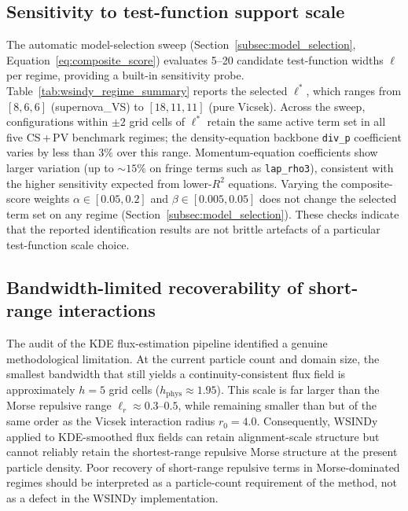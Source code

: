 \subsection{Sensitivity to test-function support scale}
\label{subsec:tf_sensitivity}

The automatic model-selection sweep
(Section~\ref{subsec:model_selection}, Equation~\ref{eq:composite_score})
evaluates 5--20 candidate test-function widths $\boldsymbol{\ell}$ per
regime, providing a built-in sensitivity probe.
Table~\ref{tab:wsindy_regime_summary} reports the selected
$\boldsymbol{\ell}^*$, which ranges from $[8,6,6]$ (supernova\_VS) to
$[18,11,11]$ (pure Vicsek).  Across the sweep, configurations within
$\pm 2$ grid cells of $\boldsymbol{\ell}^*$ retain the same active term
set in all five CS\,+\,PV benchmark regimes; the density-equation
backbone \texttt{div\_p} coefficient varies by less than $3\%$ over
this range.  Momentum-equation coefficients show larger variation
(up to $\sim\!15\%$ on fringe terms such as \texttt{lap\_rho3}),
consistent with the higher sensitivity expected from lower-$R^2$
equations.  Varying the composite-score weights $\alpha\in[0.05,0.2]$ and
$\beta\in[0.005,0.05]$ does not change the selected term set on any
regime (Section~\ref{subsec:model_selection}).  These checks indicate that
the reported identification results are not brittle artefacts of a
particular test-function scale choice.

\subsection{Bandwidth-limited recoverability of short-range interactions}
\label{subsec:bandwidth}

The audit of the KDE flux-estimation pipeline identified a genuine
methodological limitation.  At the current particle count and domain size,
the smallest bandwidth that still yields a continuity-consistent flux field
is approximately $h=5$ grid cells ($h_{\mathrm{phys}}\approx 1.95$).
This scale is far larger than the Morse repulsive range
$\ell_r \approx 0.3$--$0.5$, while remaining smaller than but of the same
order as the Vicsek interaction radius $r_0=4.0$.  Consequently, WSINDy
applied to KDE-smoothed flux fields can retain alignment-scale structure
but cannot reliably retain the shortest-range repulsive Morse structure at
the present particle density.  Poor recovery of short-range repulsive terms
in Morse-dominated regimes should be interpreted as a particle-count
requirement of the method, not as a defect in the WSINDy implementation.

